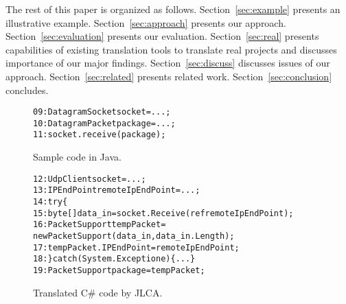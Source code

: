 The rest of this paper is organized as follows.
Section~\ref{sec:example} presents an illustrative example.
Section~\ref{sec:approach} presents our approach.
Section~\ref{sec:evaluation} presents our evaluation.
Section~\ref{sec:real} presents capabilities of existing translation tools to translate real projects and discusses importance of our major findings.
Section~\ref{sec:discuss} discusses issues of our approach.
Section~\ref{sec:related} presents related work.
Section~\ref{sec:conclusion} concludes.
\begin{figure}[t]
\begin{CodeOut}%
\begin{alltt}
09: DatagramSocket socket = ...;
10: DatagramPacket package = ...;
11: socket.receive(package);
\end{alltt}
\end{CodeOut}%
\caption{Sample code in Java.}%
\label{fig:javacode}
\begin{CodeOut}%
\begin{alltt}
12: UdpClient socket = ...;
13: IPEndPoint remoteIpEndPoint = ...;
14: try\{
15:  byte[] data_in = socket.Receive(ref remoteIpEndPoint);
16:  PacketSupport tempPacket =
          new PacketSupport(data_in, data_in.Length);
17:   tempPacket.IPEndPoint = remoteIpEndPoint;
18: \} catch (System.Exception e)\{...\}
19: PacketSupport package = tempPacket;
\end{alltt}
\end{CodeOut}%
\caption{Translated C\# code by JLCA.}%
\label{fig:codeJLCA}
\end{figure}


